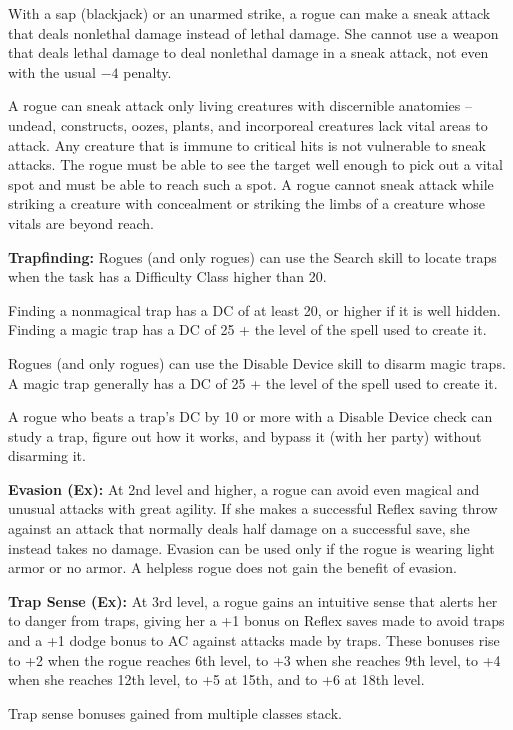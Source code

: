 With a sap (blackjack) or an unarmed strike, a rogue can make a sneak attack that deals nonlethal damage instead of lethal damage. She cannot use a weapon that deals lethal damage to deal nonlethal damage in a sneak attack, not even with the usual $-4$ penalty.

A rogue can sneak attack only living creatures with discernible anatomies -- undead, constructs, oozes, plants, and incorporeal creatures lack vital areas to attack. Any creature that is immune to critical hits is not vulnerable to sneak attacks. The rogue must be able to see the target well enough to pick out a vital spot and must be able to reach such a spot. A rogue cannot sneak attack while striking a creature with concealment or striking the limbs of a creature whose vitals are beyond reach.

\textbf{Trapfinding:} Rogues (and only rogues) can use the Search skill to locate traps when the task has a Difficulty Class higher than 20.

Finding a nonmagical trap has a DC of at least 20, or higher if it is well hidden. Finding a magic trap has a DC of 25 + the level of the spell used to create it.

Rogues (and only rogues) can use the Disable Device skill to disarm magic traps. A magic trap generally has a DC of 25 + the level of the spell used to create it.

A rogue who beats a trap’s DC by 10 or more with a Disable Device check can study a trap, figure out how it works, and bypass it (with her party) without disarming it.

\textbf{Evasion (Ex):} At 2nd level and higher, a rogue can avoid even magical and unusual attacks with great agility. If she makes a successful Reflex saving throw against an attack that normally deals half damage on a successful save, she instead takes no damage. Evasion can be used only if the rogue is wearing light armor or no armor. A helpless rogue does not gain the benefit of evasion.

\textbf{Trap Sense (Ex):} At 3rd level, a rogue gains an intuitive sense that alerts her to danger from traps, giving her a +1 bonus on Reflex saves made to avoid traps and a +1 dodge bonus to AC against attacks made by traps. These bonuses rise to +2 when the rogue reaches 6th level, to +3 when she reaches 9th level, to +4 when she reaches 12th level, to +5 at 15th, and to +6 at 18th level.

Trap sense bonuses gained from multiple classes stack.

